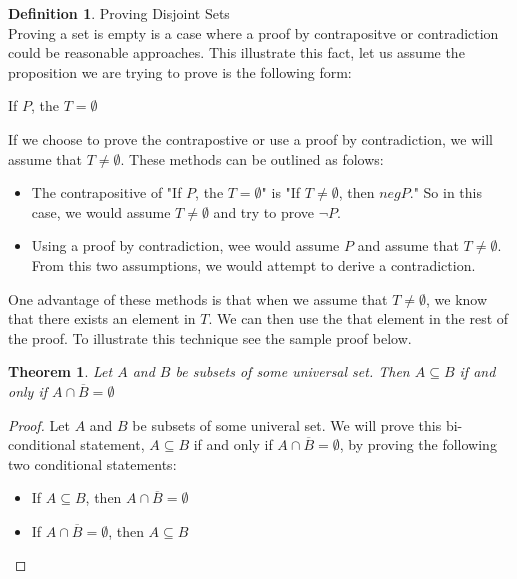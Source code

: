 \documentclass{book}
\newtheorem{theorem}{Theorem}[section]
\theoremstyle{definition}
\newtheorem{definition}{Definition}[section]
\theoremstyle{remark}
\begin{document}
\newpage
\begin{definition}
Proving Disjoint Sets \\

    Proving a set is empty is a case where a proof by contrapositve or contradiction could be reasonable approaches. This illustrate this fact, let us assume the proposition we are trying to prove is the following form: 
        \begin{center}
            If $P$, the $T = \emptyset$
        \end{center}
    If we choose to prove the contrapostive or use a proof by contradiction, we will assume that  $T \neq \emptyset$. These methods can be outlined as folows:
        \begin{itemize}
            \item The contrapositive of "If $P$, the $T = \emptyset$" is "If $T \neq \emptyset$, then $neg P$." So in this case, we would assume $T \neq \emptyset$ and try to prove $\neg P$.
            \item Using a proof by contradiction, wee would assume $P$ and assume that $T \neq \emptyset$. From this two assumptions, we would attempt to derive a contradiction. 
        \end{itemize}
    One advantage of these methods is that when we assume that $T \neq \emptyset$, we know that there exists an element in $T$. We can then use the that element in the rest of the proof. To illustrate this technique see the sample proof below. 
    
        \newpage
        \begin{tcolorbox}
            \begin{theorem}
                Let $A$ and $B$ be subsets of some universal set. Then $A \subseteq B$ if and only if $A \cap \overline{B} = \emptyset$
            \end{theorem}
        \end{tcolorbox}
        
        \begin{proof}
             Let $A$ and $B$ be subsets of some univeral set. We will prove this bi-conditional statement, $A \subseteq B$ if and only if $A \cap \overline{B} = \emptyset$, by proving the following two conditional statements:
                \begin{itemize}
                    \item If $A \subseteq B$, then $A \cap \overline{B} = \emptyset$
                    \item If $A \cap \overline{B} = \emptyset$, then $A \subseteq B$
                \end{itemize}
            

\end{proof}
\end{definition}
\end{document}

